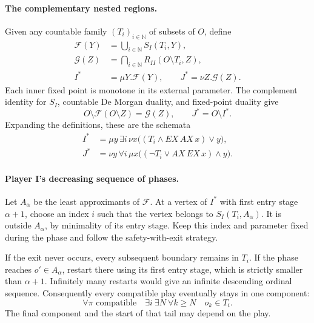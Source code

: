 \paragraph{The complementary nested regions.}
Given any countable family
\((T_i)_{i\in\mathbb N}\)
of subsets of \(O\),
define
\[
\begin{aligned}
 \mathcal F(Y)&=
       \bigcup_{i\in\mathbb N}S_I(T_i,Y),\\
 \mathcal G(Z)&=
       \bigcap_{i\in\mathbb N}R_{II}(O\setminus T_i,Z),\\
 I^*&=\mu Y.\mathcal F(Y),\qquad
 J^*=\nu Z.\mathcal G(Z).
\end{aligned}
\]
Each inner fixed point
is monotone in its
external parameter.
The complement identity
for \(S_I\), countable
De Morgan duality, and
fixed-point duality give
\[
 O\setminus\mathcal F(O\setminus Z)=\mathcal G(Z),
 \qquad
 J^*=O\setminus I^*.
\]
Expanding the definitions,
these are the schemata
\[
\begin{aligned}
 I^*&=\mu y\,\exists i\,\nu x
          \bigl((T_i\land EX\,AX\,x)\lor y\bigr),\\
 J^*&=\nu y\,\forall i\,\mu x
          \bigl((\neg T_i\lor AX\,EX\,x)\land y\bigr).
\end{aligned}
\]

\paragraph{Player I's decreasing sequence of phases.}
Let \(A_\alpha\) be the
least approximants of
\(\mathcal F\).
At a vertex of \(I^*\)
with first entry stage
\(\alpha+1\), choose
an index \(i\) such
that the vertex belongs
to \(S_I(T_i,A_\alpha)\).
It is outside \(A_\alpha\),
by minimality of its
entry stage.
Keep this index and
parameter fixed during
the phase and follow
the safety-with-exit
strategy.

If the exit never
occurs, every subsequent
boundary remains in
\(T_i\).
If the phase reaches
\(o'\in A_\alpha\),
restart there using
its first entry stage,
which is strictly
smaller than \(\alpha+1\).
Infinitely many restarts
would give an infinite
descending ordinal sequence.
Consequently every compatible
play eventually stays
in one component:
\[
 \forall\pi\text{ compatible}\quad
 \exists i\ \exists N\ \forall k\geq N
                   \quad o_k\in T_i.
\]
The final component
and the start of
that tail may depend
on the play.

